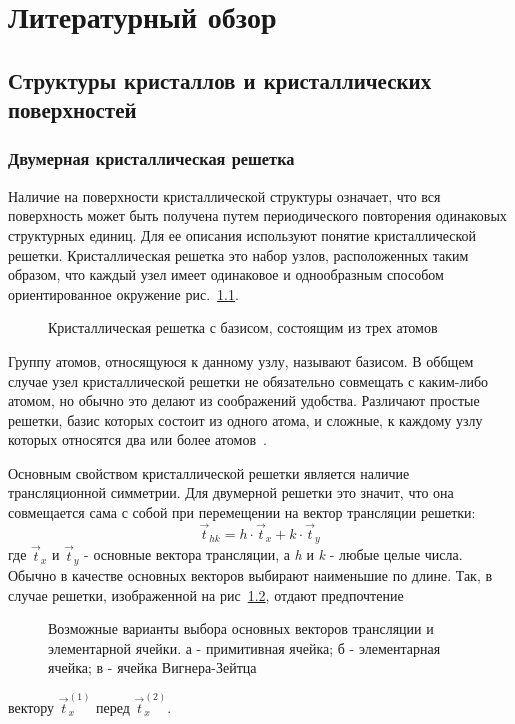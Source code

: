\chapter{Литературный обзор} \label{chapt1}

\section{Структуры кристаллов и кристаллических поверхностей} \label{sect1_1}

\subsection{Двумерная кристаллическая решетка} \label{sect1_1_1}
Наличие на поверхности кристаллической структуры означает, что вся
поверхность может быть получена путем периодического повторения 
одинаковых структурных единиц. Для ее описания используют понятие
кристаллической решетки. Кристаллическая решетка это набор узлов,
расположенных таким образом, что каждый узел имеет одинаковое и
однообразным способом ориентированное окружение рис.~\ref{pic:crystall_lattice}.
\begin{figure}[!ht]
\caption{Кристаллическая решетка с базисом, состоящим из трех атомов}
\label{pic:crystall_lattice}
\end{figure}
Группу атомов, относящуюся к данному узлу, называют базисом. В оббщем случае 
узел кристаллической решетки не обязательно совмещать с каким-либо 
атомом, но обычно это делают из соображений удобства. Различают 
простые решетки, базис которых состоит из одного атома, и сложные, 
к каждому узлу которых относятся два или более атомов~\cite{Vladimirov_book}.


Основным свойством кристаллической решетки является наличие 
трансляционной симметрии. Для двумерной решетки это значит, что она 
совмещается сама с собой при перемещении на вектор трансляции решетки:
\begin{equation}
	\label{translation_vector}
	\vec{t}_{hk}=h\cdot\vec{t}_x+k\cdot\vec{t}_y
\end{equation}
где $\vec{t}_x$ и $\vec{t}_y$ - основные вектора трансляции, а 
\textit{h} и \textit{k} - любые целые числа. Обычно в качестве основных
векторов выбирают наименьшие по длине. Так, в случае решетки, изображенной на рис~\ref{pic:crystall_lattice2}, отдают предпочтение 
\begin{figure}[!ht]
\caption{Возможные варианты выбора основных векторов трансляции и элементарной ячейки. а - примитивная ячейка; б - элементарная ячейка;
в - ячейка Вигнера-Зейтца}
\label{pic:crystall_lattice2}
\end{figure}
вектору $\vec{t}^{(1)}_x$ перед $\vec{t}^{(2)}_x$.


